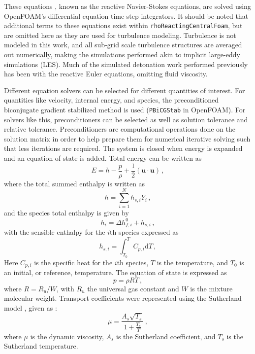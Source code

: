 These equations \cite{kuo}, known as the reactive Navier-Stokes equations, are solved using OpenFOAM's differential equation time step integrators. It should be noted that additional terms to these equations exist within \verb|rhoReactingCentralFoam|, but are omitted here as they are used for turbulence modeling. Turbulence is not modeled in this work, and all sub-grid scale turbulence structures are averaged out numerically, making the simulations performed akin to implicit large-eddy simulations (LES). Much of the simulated detonation work performed previously has been with the reactive Euler equations, omitting fluid viscosity. 

Different equation solvers can be selected for different quantities of interest. For quantities like velocity, internal energy, and species, the preconditioned biconjugate gradient stabilized method \cite{vorst} is used (\verb|PBiCGStab| in OpenFOAM). For solvers like this, preconditioners can be selected as well as solution tolerance and relative tolerance. Preconditioners are computational operations done on the solution matrix in order to help prepare them for numerical iterative solving such that less iterations are required. The system is closed when energy is expanded and an equation of state is added. Total energy \cite{kuo} can be written as 
\begin{equation}
E = h - \frac{p}{\rho} +\frac{1}{2} \left(\bm{u}\cdot\bm{u}\right)\,,
\end{equation}
where the total summed enthalpy is written \cite{kuo} as 
\begin{equation}
h = \sum_{i = 1}^Nh_{s,i}Y_i\,,
\end{equation}
and the species total enthalpy \cite{kuo} is given by 
\begin{equation}
h_{i} = \Delta h_{f,i}^0 + h_{s,i}\,,
\end{equation}
with the sensible enthalpy for the $i$th species expressed as
\begin{equation}
h_{s,i} = \int_{T_0}^T C_{p,i}\mathrm{d}T\,,
\end{equation}
Here $C_{p,i}$ is the specific heat for the $i$th species, $T$ is the temperature, and $T_0$ is an initial, or reference, temperature. The equation of state is expressed as 
\begin{equation}
p = \rho R T\,,
\end{equation}
where $R=R_u/W$, with $R_u$ the universal gas constant and $W$ is the mixture molecular weight. Transport coefficients were represented using the Sutherland model \cite{sutherland}, given as \cite{ofug}:
\begin{equation}
\mu = \frac{A_s \sqrt{T_s}}{1 + \frac{T_s}{T}} \,,
\end{equation}
where $\mu$ is the dynamic viscosity, $A_s$ is the Sutherland coefficient, and $T_s$ is the Sutherland temperature. 

